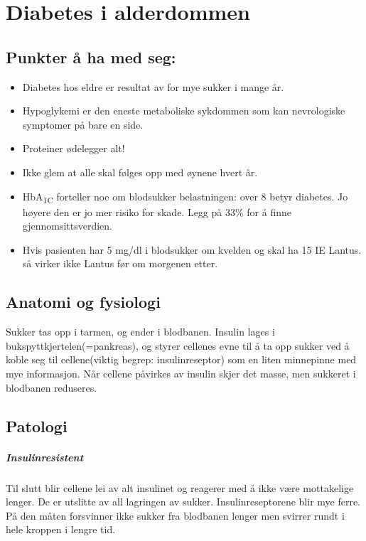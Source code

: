 	\chapter{Diabetes i alderdommen}%
		\section{Punkter å ha med seg:}
			\begin{itemize}
				\item Diabetes hos eldre er resultat av for mye sukker i mange år.\\
				\item Hypoglykemi er den eneste metaboliske sykdommen som kan nevrologiske symptomer på bare en side.\\
				\item Proteiner ødelegger alt!\\
				\item Ikke glem at alle skal følges opp med øynene hvert år.\\
				\item HbA\textsubscript{1C} forteller noe om blodsukker belastningen: over 8 betyr diabetes. Jo høyere den er jo mer risiko for skade. Legg på 33\% for å finne gjennomsittsverdien.\\
				\item Hvis pasienten har 5 mg/dl i blodsukker om kvelden og skal ha 15 IE Lantus\textregistered. så virker ikke Lantus før om morgenen etter.\\
			\end{itemize}
		\section{Anatomi og fysiologi}
			Sukker tas opp i tarmen, og ender i blodbanen. Insulin lages i bukspyttkjertelen(=pankreas), og styrer cellenes evne til å ta opp sukker ved å koble seg til cellene(viktig begrep: insulinreseptor) som en liten minnepinne med mye informasjon. Når cellene påvirkes av insulin skjer det masse, men sukkeret i blodbanen reduseres.
		\section{Patologi}
			\paragraph{Insulinresistent\\}
				Til slutt blir cellene lei av alt insulinet og reagerer med å ikke være mottakelige lenger. De er utslitte av all lagringen av sukker. Insulinreseptorene blir mye ferre. På den måten forsvinner ikke sukker fra blodbanen lenger men svirrer rundt i hele kroppen i lengre tid.
